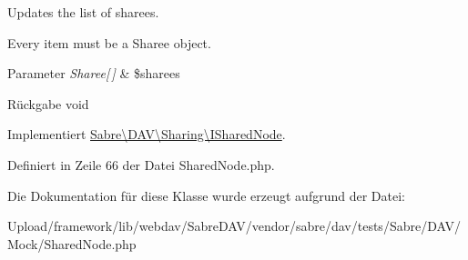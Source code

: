 Updates the list of sharees.

Every item must be a Sharee object.


\begin{DoxyParams}{Parameter}
{\em Sharee\mbox{[}$\,$\mbox{]}} & \$sharees \\
\hline
\end{DoxyParams}
\begin{DoxyReturn}{Rückgabe}
void 
\end{DoxyReturn}


Implementiert \mbox{\hyperlink{interface_sabre_1_1_d_a_v_1_1_sharing_1_1_i_shared_node_a76948a1464503ea23d3dd8ff51b561ce}{Sabre\textbackslash{}\+D\+A\+V\textbackslash{}\+Sharing\textbackslash{}\+I\+Shared\+Node}}.



Definiert in Zeile 66 der Datei Shared\+Node.\+php.



Die Dokumentation für diese Klasse wurde erzeugt aufgrund der Datei\+:\begin{DoxyCompactItemize}
\item 
Upload/framework/lib/webdav/\+Sabre\+D\+A\+V/vendor/sabre/dav/tests/\+Sabre/\+D\+A\+V/\+Mock/Shared\+Node.\+php\end{DoxyCompactItemize}

